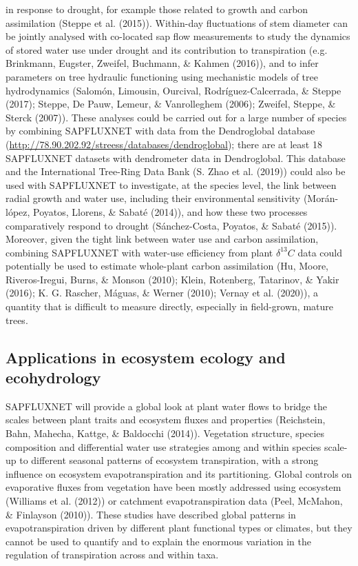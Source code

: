 \documentclass[11pt,twoside]{reedthesis}
\begin{document}
in response to drought, for example those related to growth and carbon
assimilation (Steppe et al. (2015)). Within-day fluctuations of stem
diameter can be jointly analysed with co-located sap flow measurements
to study the dynamics of stored water use under drought and its
contribution to transpiration (e.g. Brinkmann, Eugster, Zweifel,
Buchmann, \& Kahmen (2016)), and to infer parameters on tree hydraulic
functioning using mechanistic models of tree hydrodynamics (Salomón,
Limousin, Ourcival, Rodríguez-Calcerrada, \& Steppe (2017); Steppe, De
Pauw, Lemeur, \& Vanrolleghem (2006); Zweifel, Steppe, \& Sterck
(2007)). These analyses could be carried out for a large number of
species by combining SAPFLUXNET with data from the Dendroglobal database
(\url{http://78.90.202.92/streess/databases/dendroglobal}); there are at
least 18 SAPFLUXNET datasets with dendrometer data in Dendroglobal. This
database and the International Tree-Ring Data Bank (S. Zhao et al.
(2019)) could also be used with SAPFLUXNET to investigate, at the
species level, the link between radial growth and water use, including
their environmental sensitivity (Morán-lópez, Poyatos, Llorens, \&
Sabaté (2014)), and how these two processes comparatively respond to
drought (Sánchez-Costa, Poyatos, \& Sabaté (2015)). Moreover, given the
tight link between water use and carbon assimilation, combining
SAPFLUXNET with water-use efficiency from plant \(\delta^{13}C\) data
could potentially be used to estimate whole-plant carbon assimilation
(Hu, Moore, Riveros-Iregui, Burns, \& Monson (2010); Klein, Rotenberg,
Tatarinov, \& Yakir (2016); K. G. Rascher, Máguas, \& Werner (2010);
Vernay et al. (2020)), a quantity that is difficult to measure directly,
especially in field-grown, mature trees.\par

\subsection{Applications in ecosystem ecology and
ecohydrology}\label{applications-in-ecosystem-ecology-and-ecohydrology}

SAPFLUXNET will provide a global look at plant water flows to bridge the
scales between plant traits and ecosystem fluxes and properties
(Reichstein, Bahn, Mahecha, Kattge, \& Baldocchi (2014)). Vegetation
structure, species composition and differential water use strategies
among and within species scale-up to different seasonal patterns of
ecosystem transpiration, with a strong influence on ecosystem
evapotranspiration and its partitioning. Global controls on evaporative
fluxes from vegetation have been mostly addressed using ecosystem
(Williams et al. (2012)) or catchment evapotranspiration data (Peel,
McMahon, \& Finlayson (2010)). These studies have described global
patterns in evapotranspiration driven by different plant functional
types or climates, but they cannot be used to quantify and to explain
the enormous variation in the regulation of transpiration across and
within taxa.\par
\end{document}
